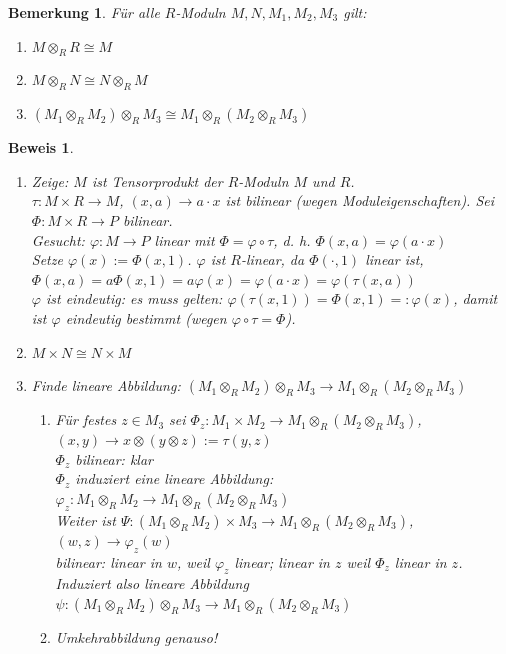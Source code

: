 \documentclass[a4paper,12pt]{scrbook}
\theoremstyle{break}
\newtheorem{Bem}[Def]{Bemerkung}
\theoremstyle{nonumberbreak}
\newtheorem{Bew}{Beweis}
\theoremstyle{nonumberplain}
\begin{document}
\begin{Bem}
  Für alle $R$-Moduln $M, N, M_1, M_2, M_3$ gilt:
  \begin{enumerate}
  	\item $M \otimes_R R \cong M$
  	\item $M \otimes_R N \cong N \otimes_R M$
  	\item $(M_1 \otimes_R M_2) \otimes_R M_3 \cong M_1 \otimes_R (M_2 \otimes_R M_3)$
  \end{enumerate}
\end{Bem}
\begin{Bew}
  \begin{enumerate}
    \item[a)] Zeige: $M$ ist Tensorprodukt der $R$-Moduln $M$ und $R$.\\
	  $\tau: M \times R \rightarrow M$, $(x,a) \rightarrow a \cdot x$ ist bilinear (wegen 
	  Moduleigenschaften). Sei $\Phi: M \times R \rightarrow P$ bilinear.\\
	  Gesucht: $\varphi: M \rightarrow P$ linear mit $\Phi = \varphi \circ \tau$, d. h. 
	  $\Phi(x,a) = \varphi(a \cdot x)$\\
	  Setze $\varphi(x) := \Phi(x,1)$. $\varphi$ ist $R$-linear, da $\Phi( \cdot, 1)$ linear
	  ist, $\Phi(x,a) = a\Phi(x,1) = a\varphi(x) = \varphi(a \cdot x ) = \varphi(\tau(x,a))$\\
	  $\varphi$ ist eindeutig: es muss gelten: $\varphi(\tau(x,1)) = \Phi(x,1) =: \varphi(x)$, 
	  damit ist $\varphi$ eindeutig bestimmt (wegen $\varphi \circ \tau = \Phi$).
    \item[b)] $M \times N \cong N \times M$
    \item[c)] Finde lineare Abbildung: $(M_1 \otimes_R M_2) \otimes_R M_3 \rightarrow M_1 \otimes_R (M_2 \otimes_R M_3)$
	  \begin{enumerate}
	    \item[ 1. ] Für festes $z \in M_3$ sei $\Phi_z: M_1 \times M_2 \rightarrow M_1 \otimes_R (M_2 \otimes_R M_3)$,\\
		  $(x,y) \rightarrow x \otimes (y \otimes z) := \tau ( y,z )$\\
		  $\Phi_z$ bilinear: klar\\
		  $\Phi_z$ induziert eine lineare Abbildung: $\varphi_z: M_1 \otimes_R M_2 \rightarrow M_1 \otimes_R (M_2 \otimes_R M_3)$\\
		  Weiter ist $\Psi: ( M_1 \otimes_R M_2 ) \times M_3 \rightarrow M_1 \otimes_R (M_2 \otimes_R M_3)$,
		  $(w,z) \rightarrow \varphi_z (w)$\\
		  bilinear: linear in $w$, weil $\varphi_z$ linear; linear in $z$ weil $\Phi_z$ linear in $z$.\\
		  Induziert also lineare Abbildung $\psi: (M_1 \otimes_R M_2) \otimes_R M_3 \rightarrow M_1 \otimes_R (M_2 \otimes_R M_3)$
	    \item[2.] Umkehrabbildung genauso!
	  \end{enumerate}
  \end{enumerate}
\end{Bew}
\end{document}
